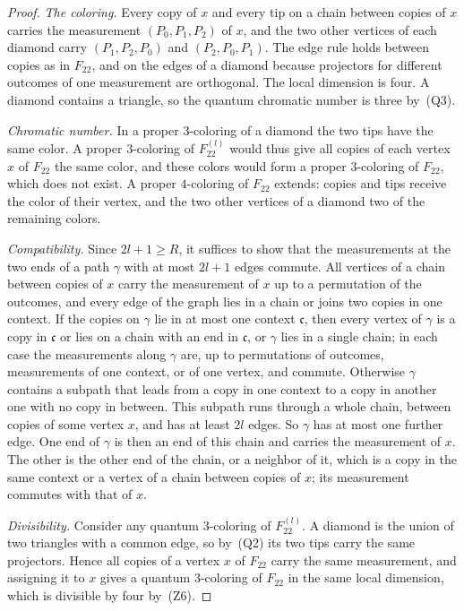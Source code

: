 \begin{proof}
\emph{The coloring.} Every copy of $x$ and every tip on a chain between copies of $x$ carries the measurement $(P_0,P_1,P_2)$ of $x$, and the two other vertices of each diamond carry $(P_1,P_2,P_0)$ and $(P_2,P_0,P_1)$. The edge rule holds between copies as in $F_{22}$, and on the edges of a diamond because projectors for different outcomes of one measurement are orthogonal. The local dimension is four. A diamond contains a triangle, so the quantum chromatic number is three by~(Q3).

\emph{Chromatic number.} In a proper $3$-coloring of a diamond the two tips have the same color. A proper $3$-coloring of $F_{22}^{(l)}$ would thus give all copies of each vertex $x$ of $F_{22}$ the same color, and these colors would form a proper $3$-coloring of $F_{22}$, which does not exist. A proper $4$-coloring of $F_{22}$ extends: copies and tips receive the color of their vertex, and the two other vertices of a diamond two of the remaining colors.

\emph{Compatibility.} Since $2l+1\ge R$, it suffices to show that the measurements at the two ends of a path $\gamma$ with at most $2l+1$ edges commute. All vertices of a chain between copies of $x$ carry the measurement of $x$ up to a permutation of the outcomes, and every edge of the graph lies in a chain or joins two copies in one context. If the copies on $\gamma$ lie in at most one context $\mathfrak c$, then every vertex of $\gamma$ is a copy in $\mathfrak c$ or lies on a chain with an end in $\mathfrak c$, or $\gamma$ lies in a single chain; in each case the measurements along $\gamma$ are, up to permutations of outcomes, measurements of one context, or of one vertex, and commute. Otherwise $\gamma$ contains a subpath that leads from a copy in one context to a copy in another one with no copy in between. This subpath runs through a whole chain, between copies of some vertex $x$, and has at least $2l$ edges. So $\gamma$ has at most one further edge. One end of $\gamma$ is then an end of this chain and carries the measurement of $x$. The other is the other end of the chain, or a neighbor of it, which is a copy in the same context or a vertex of a chain between copies of $x$; its measurement commutes with that of $x$.

\emph{Divisibility.} Consider any quantum $3$-coloring of $F_{22}^{(l)}$. A diamond is the union of two triangles with a common edge, so by~(Q2) its two tips carry the same projectors. Hence all copies of a vertex $x$ of $F_{22}$ carry the same measurement, and assigning it to $x$ gives a quantum $3$-coloring of $F_{22}$ in the same local dimension, which is divisible by four by~(Z6).
\end{proof}

